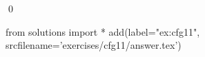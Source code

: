 
\begin{ex} 
  \label{ex:cfg11}
  
  \qed
\end{ex} 
\begin{python0}
from solutions import *
add(label="ex:cfg11",
    srcfilename='exercises/cfg11/answer.tex') 
\end{python0}
